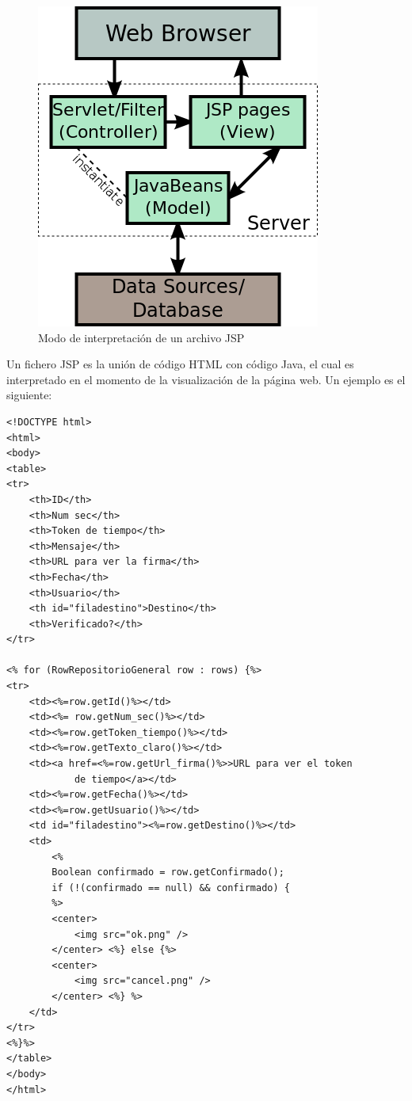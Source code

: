 \begin{itemize}
\begin{figure}
  \centering
    \includegraphics[scale=0.5]{./GoogleAppEngine/imagenes/JSP_Model.png}
  \caption{Modo de interpretación de un archivo JSP}
  \label{fig:modoJSP}
\end{figure}

Un fichero JSP es la unión de código HTML con código Java, el cual es interpretado en el momento de la visualización de la página web. Un ejemplo es el siguiente:
 
\begin{lstlisting}[style=HTML]   
<!DOCTYPE html>
<html>
<body>
<table>
<tr>
	<th>ID</th>
	<th>Num sec</th>
	<th>Token de tiempo</th>
	<th>Mensaje</th>
	<th>URL para ver la firma</th>
	<th>Fecha</th>
	<th>Usuario</th>
	<th id="filadestino">Destino</th>
	<th>Verificado?</th>
</tr>

<% for (RowRepositorioGeneral row : rows) {%>
<tr>
	<td><%=row.getId()%></td>
	<td><%= row.getNum_sec()%></td>
	<td><%=row.getToken_tiempo()%></td>
	<td><%=row.getTexto_claro()%></td>
	<td><a href=<%=row.getUrl_firma()%>>URL para ver el token
			de tiempo</a></td>
	<td><%=row.getFecha()%></td>
	<td><%=row.getUsuario()%></td>
	<td id="filadestino"><%=row.getDestino()%></td>
	<td>
		<%
		Boolean confirmado = row.getConfirmado();
		if (!(confirmado == null) && confirmado) {
		%>
		<center>
			<img src="ok.png" />
		</center> <%} else {%>
		<center>
			<img src="cancel.png" />
		</center> <%} %>
	</td>
</tr>
<%}%>
</table>
</body>
</html>
\end{lstlisting}


\end{itemize}
